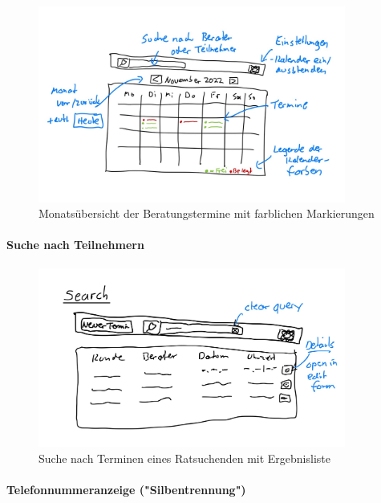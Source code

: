 \documentclass[12pt]{article}
\begin{document}
\begin{figure}[h]
    \caption{Monatsübersicht der Beratungstermine mit farblichen Markierungen}
    \centering
    \includegraphics[width=0.9\textwidth]{doodle_month_view.jpeg}
\end{figure}

\paragraph{Suche nach Teilnehmern}

\begin{figure}[h]
    \caption{Suche nach Terminen eines Ratsuchenden mit Ergebnisliste}
    \centering
    \includegraphics[width=0.9\textwidth]{doodle_search_view.jpeg}
\end{figure}

\paragraph{Telefonnummeranzeige ("Silbentrennung")}
\end{document}
